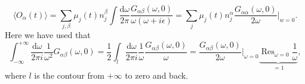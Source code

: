 \documentclass[master,       %
               twoside,        %
               BCOR10mm,       %
               english,ngerman, %
               ]{GAUBM}
\begin{document}
\begin{otherlanguage}{english}
\begin{equation}
	\langle O_\alpha(t) \rangle = \sum_{j, \beta} \mu_j(t) n^\beta_j \int \frac{\mathrm{d} \omega}{2 \pi} \frac{G_{\alpha \beta}(\omega, 0)} { \omega (\omega + i \epsilon)} =  \sum_{j} \mu_j(t) n^\alpha_j \frac{G_{\alpha \alpha}(\omega, 0)}{2 \omega} \Big|_{w = 0}.
	\label{eq:chemical_potentials_linear_response}
\end{equation}
Here we have used that
\begin{equation}
	\int_{-\infty}^{+\infty} \frac{\mathrm{d} \omega}{2\pi i} \frac{1}{\omega^2} G_{\alpha \beta}(\omega, 0) = \frac{1}{2} \int_l \frac{\mathrm{d} \omega}{2\pi i} \frac{1}{\omega} \frac{G_{\alpha \beta}(\omega, 0)}{\omega} = \frac{G_{\alpha \beta}(\omega, 0)}{2 \omega} \Big|_{\omega = 0} \underbrace{\operatorname{Res}_{\omega = 0} \frac{1}{\omega}}_{= 1},
\end{equation}
where $l$ is the contour from $+\infty$ to zero and back.


\end{otherlanguage}
\end{document}
